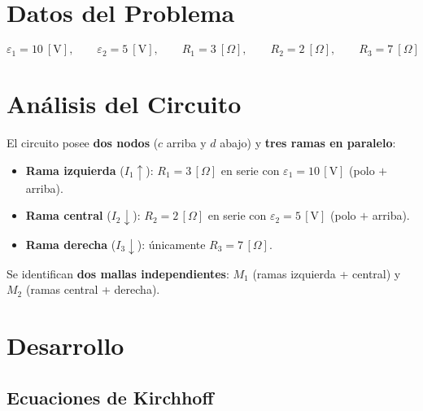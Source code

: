 \documentclass[12pt,letterpaper]{article}
\begin{document}
\section*{Datos del Problema}

\[
    \varepsilon_1 = 10\ [\text{V}],\qquad
    \varepsilon_2 = 5\ [\text{V}],\qquad
    R_1 = 3\ [\Omega],\qquad
    R_2 = 2\ [\Omega],\qquad
    R_3 = 7\ [\Omega]
\]

\section*{An\'alisis del Circuito}

El circuito posee \textbf{dos nodos} ($c$ arriba y $d$ abajo) y \textbf{tres ramas en paralelo}:

\begin{itemize}
    \item \textbf{Rama izquierda} ($I_1\uparrow$): \textcolor{colR1}{$R_1 = 3\,[\Omega]$}
          en serie con \textcolor{colE1}{$\varepsilon_1 = 10\,[\text{V}]$} (polo $+$ arriba).
    \item \textbf{Rama central} ($I_2\downarrow$): \textcolor{colR2}{$R_2 = 2\,[\Omega]$}
          en serie con \textcolor{colE2}{$\varepsilon_2 = 5\,[\text{V}]$} (polo $+$ arriba).
    \item \textbf{Rama derecha} ($I_3\downarrow$): \'unicamente
          \textcolor{colR3}{$R_3 = 7\,[\Omega]$}.
\end{itemize}

Se identifican \textbf{dos mallas independientes}: $M_1$ (ramas izquierda + central)
y $M_2$ (ramas central + derecha).

\section*{Desarrollo}

\subsection*{Ecuaciones de Kirchhoff}
\end{document}
